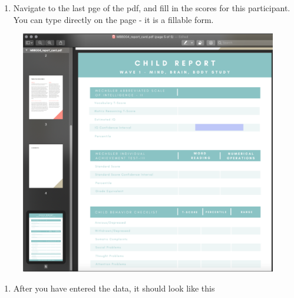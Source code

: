 \documentclass[]{book}
\providecommand{\tightlist}{%
  \setlength{\itemsep}{0pt}\setlength{\parskip}{0pt}}
\begin{document}
\begin{enumerate}
\def\labelenumi{\arabic{enumi}.}
\setcounter{enumi}{3}
\tightlist
\item
  Navigate to the last pge of the pdf, and fill in the scores for this participant. You can type directly on the page - it is a fillable form.
\end{enumerate}

\begin{figure}
\centering
\includegraphics{images/final_checklist/report_cards/4.png}
\caption{}
\end{figure}

\begin{enumerate}
\def\labelenumi{\arabic{enumi}.}
\setcounter{enumi}{4}
\tightlist
\item
  After you have entered the data, it should look like this
\end{enumerate}
\end{document}
